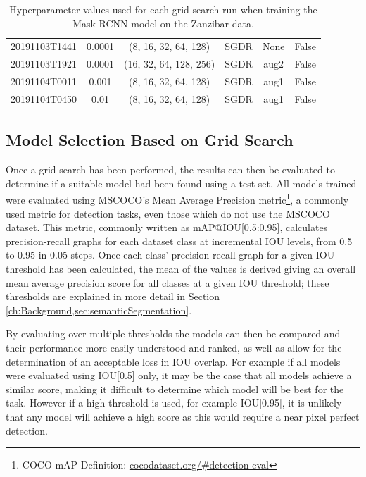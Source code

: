 \begin{table}[!ht]
\begin{adjustbox}{width=\columnwidth, center}
\begin{tabular}{cccccc}
			20191103T1441 &       0.0001 &     (8, 16, 32, 64, 128) &      SGDR &                  None &                  False \\
			20191103T1921 &       0.0001 &   (16, 32, 64, 128, 256) &      SGDR &                  aug2 &                  False \\
			20191104T0011 &        0.001 &     (8, 16, 32, 64, 128) &      SGDR &                  aug1 &                  False \\
			20191104T0450 &         0.01 &     (8, 16, 32, 64, 128) &      SGDR &                  aug1 &                  False \\
			\bottomrule
		\end{tabular}
	\end{adjustbox}
	\caption{Hyperparameter values used for each grid search run when training the Mask-RCNN model on the Zanzibar data.}\label{tab:MaskRCNNHyperparamTuningGridSearch}
\end{table}

\subsection{Model Selection Based on Grid Search}\label{ch:cetDet,sec:ModelSelection,sub:ModelSelectionBasedOnGridSearch}

Once a grid search has been performed, the results can then be evaluated to determine if a suitable model had been found using a test set. All models trained were evaluated using MSCOCO's Mean Average Precision metric\footnote{COCO mAP Definition: \href{https://cocodataset.org/\#detection-eval}{cocodataset.org/\#detection-eval}}, a commonly used metric for detection tasks, even those which do not use the MSCOCO dataset. This metric, commonly written as mAP@IOU[0.5:0.95], calculates precision-recall graphs for each dataset class at incremental IOU levels, from 0.5 to 0.95 in 0.05 steps. Once each class' precision-recall graph for a given IOU threshold has been calculated, the mean of the values is derived giving an overall mean average precision score for all classes at a given IOU threshold; these thresholds are explained in more detail in Section \ref{ch:Background,sec:semanticSegmentation}.

By evaluating over multiple thresholds the models can then be compared and their performance more easily understood and ranked, as well as allow for the determination of an acceptable loss in IOU overlap. For example if all models were evaluated using IOU[0.5] only, it may be the case that all models achieve a similar score, making it difficult to determine which model will be best for the task. However if a high threshold is used, for example IOU[0.95], it is unlikely that any model will achieve a high score as this would require a near pixel perfect detection. 

